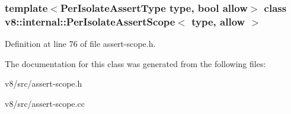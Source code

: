 \subsubsection*{template$<$Per\+Isolate\+Assert\+Type type, bool allow$>$\newline
class v8\+::internal\+::\+Per\+Isolate\+Assert\+Scope$<$ type, allow $>$}



Definition at line 76 of file assert-\/scope.\+h.



The documentation for this class was generated from the following files\+:\begin{DoxyCompactItemize}
\item 
v8/src/assert-\/scope.\+h\item 
v8/src/assert-\/scope.\+cc\end{DoxyCompactItemize}
